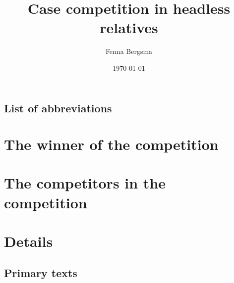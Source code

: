 \documentclass[11pt]{memoir}
\title{Case competition in headless relatives}
\author{Fenna Bergsma}
\date{\today}
\begin{document}
\maketitle

\frontmatter

\clearpage
\tableofcontents

\clearpage
\listoftables

\chapter*{List of abbreviations}
\printacronyms[include-classes=abbr, heading=none]

\mainmatter
\setcounter{secnumdepth}{4}



\part{The winner of the competition}\label{part:complexity}



\part{The competitors in the competition}\label{part:direction}



\part{Details}\label{part:details}




\backmatter

\clearpage
\chapter*{Primary texts}
\printacronyms[include-classes=texts, heading=none]

\printbibliography

\end{document}
